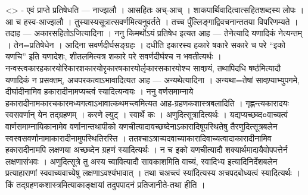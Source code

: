 \textless{}\textgreater{} - एवं प्राप्ते प्रतिषेधति --- नाज्झलौ । आसहितः
अच्-आच् । शाकपार्थिवादित्वात्सहितशब्दस्य लोपः । आ च हस्व-आज्झलौ ।
तुस्यास्यसूत्रात्सवर्णमित्यनुवर्तते । तच्च पुँल्लिङ्गाद्विवचनान्ततया
विपरिणम्यते । तदाह --- अकारसहितोऽजित्यादिना । ननु किमर्थोऽयं प्रतिषेध
इत्यत आह --- तेनेत्यादि यणादिकं नेत्यन्तम् । तेन=प्रतिषेधेन । आदिना
सवर्णदीर्घसङ्ग्रहः । दधीति इकारस्य हकारे षकारे सकारे च परे ``इको यणचि''
इति यणादेशः, शीतलमित्यत्र शकारे परे सवर्णदीर्घश्च न भवतीत्यर्थः ।
नन्वस्त्वकारहकारयोरिकारशकारयोरृकारषकारयोर्लृकारसकारयोश्च सावण्र्यं,
तथापिदधि षष्ठ॑मित्यादौ यणादिकं न प्रसक्तम्, अचपरकत्वाऽभावादित्यत आह ---
अन्यथेत्यादिना । अन्यथा=तेषां सावण्र्याभ्युपगमे, दीर्घादीनामिव
हकारादीनामप्यच्त्वं स्यादित्यन्वयः । ननु वर्णसमाम्नाये
हकारादीनामकारचकारमध्यगत्वाऽभावात्कथमच्त्वमित्यत आह-ग्रहणकशास्त्रबलादिति
। गृह्णन्त्यकारादयः स्वसवर्णान् येन तद्ग्रहणम् । करणे ल्युट् । स्वार्थे
कः । अणुदित्सूत्रादित्यर्थः । यद्यप्यच्छब्द०वाच्यत्वं
वार्णसमाम्नायिकानामेव वर्णानान्तथापीको
यणचीत्यादावच्छब्देनाऽकारादिषूपस्थितेषु तैरणुदित्सूत्रबलेन
स्वस्वसवर्णानामाकारादीनामुपस्थितिरस्ति ।
ततश्चाऽत्राच्पदवाच्याकारादिवाच्यत्वादाकारादीनामिव हकारादीनामपि लक्षणया
अच्छब्देन ग्रहणं स्यादित्यर्थः । न च इको यणचीत्यादौ
शक्यार्थमादायैवोपपत्तेर्न लक्षणासंभवः । अणुदित्सूत्रे तु अस्य
च्वावित्यादौ सावकाशमिति वाच्यं, स्वादिभ्य इत्यादिनिर्देशबलेन
प्रत्याहाराणां स्ववाच्यवाच्येषु लक्षणाऽवश्यंभावात् । तथा चअच्त्वं
स्या॑दित्यस्य अचपदबोध्यत्वं स्यादित्यर्थः । किं
तद्ग्रहणकशास्त्रमित्याकाङ्क्षायां तदुपपादनं प्रतिजानीते-तथा हीति ।
